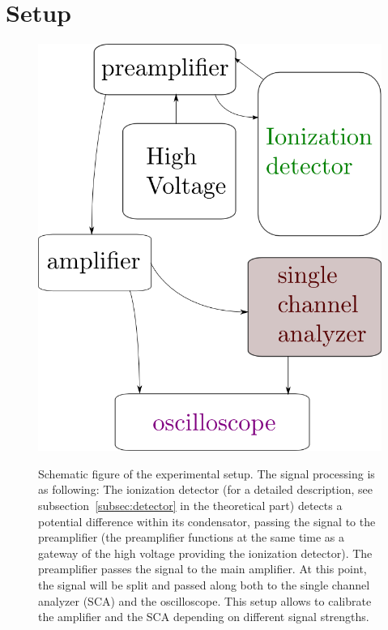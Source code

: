 \clearpage
\section{Setup}
\label{sec:setup}

\begin{figure}
    \centering
    \caption{Schematic figure of the experimental setup. The
    signal processing is as following: The ionization detector
    (for a detailed description, see subsection~\ref{subsec:detector} 
    in the theoretical part) detects a potential difference within its
    condensator, passing the signal to the preamplifier (the preamplifier
    functions at the same time as a gateway of the high voltage providing
    the ionization detector). The preamplifier passes the signal to the
    main amplifier. At this point, the signal will be split and passed along
    both to the single channel analyzer (SCA) and the oscilloscope. This setup
    allows to calibrate the amplifier and the SCA depending on different
    signal strengths.
    }
    \includegraphics[width=0.5\linewidth]{figures/setup}
    \label{fig:setup1}
\end{figure}

